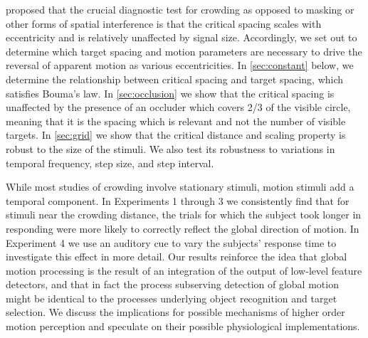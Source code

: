 \documentclass[manuscript]{subfiles}
\begin{document}
\citet{Pelli:2004km} proposed that the crucial diagnostic test for crowding as opposed to masking or other forms of spatial interference is that the critical spacing scales with eccentricity and is relatively unaffected by signal size. Accordingly, we set out to determine which target spacing and motion parameters are necessary to drive the reversal of apparent motion as various eccentricities. In \autoref{sec:constant} below, we determine the relationship between critical spacing and target spacing, which satisfies Bouma's law. In \autoref{sec:occlusion} we show that the critical spacing is unaffected by the presence of an occluder which covers 2/3 of the visible circle, meaning that it is the spacing which is relevant and not the number of visible targets. In \autoref{sec:grid} we show that the critical distance and scaling property is robust to the size of the stimuli. We also test its robustness to variations in temporal frequency, step size, and step interval. 

While most studies of crowding involve stationary stimuli, motion stimuli add a temporal component. In Experiments 1 through 3 we consistently find that for stimuli near the crowding distance, the trials for which the subject took longer in responding were more likely to correctly reflect the global direction of motion. In Experiment 4 we use an auditory cue to vary the subjects' response time to investigate this effect in more detail. Our results reinforce the idea that global motion processing is the result of an integration of the output of low-level feature detectors, and that in fact the process subserving detection of global motion might be identical to the processes underlying object recognition and target selection. We discuss the implications for possible mechanisms of higher order motion perception and speculate on their possible physiological implementations.

\biblio
\end{document}
